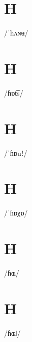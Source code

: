 \documentclass[10pt,a4paper,twoside]{book}
\begin{document}
\section*{H}

\begin{multicols}{3}
 {/ˈhʌɴʉ/} {}
\end{multicols}

\section*{H}

\begin{multicols}{3}
 {/ɦɒt͡s/} {}
\end{multicols}

\section*{H}

\begin{multicols}{3}
 {/ˈɦɒuǃ/} {}
\end{multicols}

\section*{H}

\begin{multicols}{3}
 {/ˈɦɒχɒ/} {}
\end{multicols}

\section*{H}

\begin{multicols}{3}
 {/ɦɶ/} {}
\end{multicols}

\section*{H}

\begin{multicols}{3}
 {/ɦɶǀ/} {}
\end{multicols}
\end{document}
